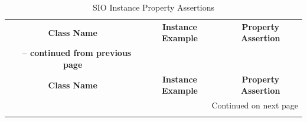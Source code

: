 \begin{center}
\begin{longtable}{|c||c||c|}
\caption[SIO Instance Property Assertions]{SIO Instance Property Assertions} \label{tab:app-ipa} \\

\hline \multicolumn{1}{|c||}{\textbf{Class Name}} & \multicolumn{1}{c||}{\textbf{Instance Example}} & \multicolumn{1}{c|}{\textbf{Property Assertion}} \\ \hhline{|=#=#=|}
\endfirsthead

\multicolumn{3}{c}%
{{\bfseries \tablename\ \thetable{} -- continued from previous page}} \\
\hline \multicolumn{1}{|c||}{\textbf{Class Name}} &
\multicolumn{1}{c||}{\textbf{Instance Example}} &
\multicolumn{1}{c|}{\textbf{Property Assertion}} \\ \hline 
\endhead

\hline \multicolumn{3}{|r|}{{Continued on next page}} \\ \hline
\endfoot


\end{longtable}
\end{center}
